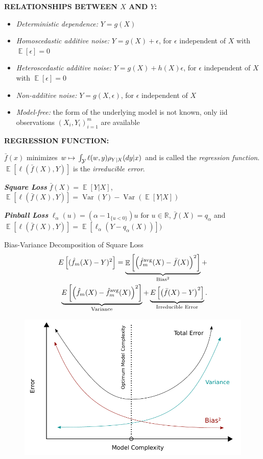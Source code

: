 \documentclass[a4paper,10pt]{article}
\newenvironment{myitemize}
{\vspace{-0.25cm}\begin{itemize}}
{\end{itemize}}
\def\R{\mathbb{R}}
\DeclareMathOperator{\E}{\mathbb{E}}
\DeclareMathOperator{\Var}{Var}
\newcommand{\subtitle}[1]{\vspace{0.25cm}\begin{normalsize}\textbf{\textcolor{gray!150}{\uppercase{#1}}}\end{normalsize}}
\begin{document}
\begin{small}
\subtitle{Relationships between $X$ and $Y$:}
\vspace{0.2cm}
\begin{myitemize}
    \item \textit{Deterministic dependence:} $Y = g(X)$
    \item \textit{Homoscedastic additive noise:} $Y = g(X) + \epsilon$, for $\epsilon$ independent of $X$ with $\E[\epsilon] = 0$
    \item \textit{Heteroscedastic additive noise:} $Y = g(X) + h(X)\epsilon$, for $\epsilon$ independent of $X$ with $\E[\epsilon] = 0$
    \item \textit{Non-additive noise:} $Y = g(X, \epsilon)$, for $\epsilon$ independent of $X$
    \item \textit{Model-free:} the form of the underlying model is not known, only iid observations $(X_i, Y_i)_{i=1}^m$ are available
\end{myitemize}


\subtitle{Regression Function:}
\(\bar{f}(x)\) minimizes \(w \mapsto \\ \int_{\mathcal{Y}} \ell(w, y) \rho_{Y|X}(dy | x)\) and is called the \textit{regression function}. \\ \(\E[\ell(\bar{f}(X), Y)]\) is the \textit{irreducible error}.

\textbf{\textit{Square Loss}} \(\bar{f}(X) = \E[Y | X]\), \(\E[\ell(\bar{f}(X), Y)] = \Var(Y) - \Var(\E[Y | X])\) 

\textbf{\textit{Pinball Loss}}
\( \ell_{\alpha}(u) = \left( \alpha - 1_{\{u < 0\}} \right) u \text{ for } u \in \R \), \(\bar{f}(X) = q_\alpha\) and \(\E[\ell(\bar{f}(X), Y)] = \E \left[ \ell_\alpha( Y - q_\alpha(X) ) \right ])\) 

\begin{subbox}{Bias-Variance Decomposition of Square Loss}
\begin{align}
E\left[ (\hat{f}_m(X) - Y)^2 \right] = 
\underbrace{ \E \left[ \left( \hat{f}_m^{\text{avg}}(X) - \bar{f}(X) \right)^2 \right]}_{\text{Bias}^2} + \notag  \\
 \underbrace{E\left[ \left( \hat{f}_m(X) - \hat{f}_m^{\text{avg}}(X) \right)^2 \right] }_{\text{Variance}} \notag 
 + \underbrace{E\left[ \left( \bar{f}(X) - Y \right)^2 \right]}_{\text{Irreducible Error}}. \notag
\end{align}
\end{subbox}

\begin{figure}
    \centering
    \vspace{-20pt}
    \includegraphics[width=0.45\columnwidth]{figures/Bias_and_variance_contributing_to_total_error.pdf}
    \vspace{-30pt}
\end{figure}


\end{small}
\end{document}
